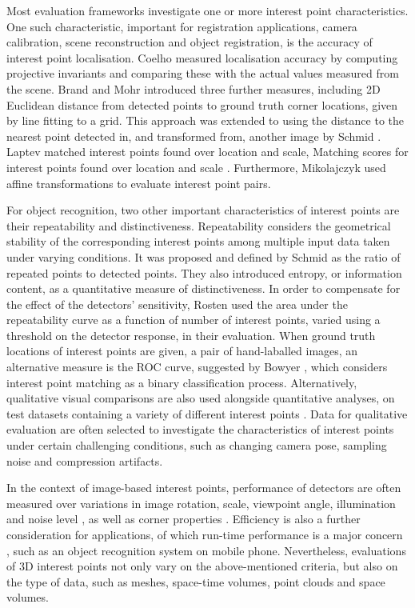 Most evaluation frameworks investigate one or more interest point characteristics. 
One such characteristic, important for registration applications, \eg camera calibration, scene reconstruction and object registration, is the accuracy of interest point localisation. 
Coelho \etal \cite{Coelho1992} measured localisation accuracy by computing projective invariants and comparing these with the actual values measured from the scene. 
Brand and Mohr \cite{Brand1994} introduced three further measures, including 2D Euclidean distance from detected points to ground truth corner locations, given by line fitting to a grid. This approach was extended to using the distance to the nearest point detected in, and transformed from, another image by Schmid \etal \cite{Schmid2000}. 
Laptev \cite{Laptev2003} matched interest points found over location and scale, 
Matching scores for interest points found over location and scale \cite{Laptev2003}. Furthermore, Mikolajczyk \etal \cite{Mikolajczyk2004} used affine transformations to evaluate interest point pairs. 

For object recognition, two other important characteristics of interest points are their repeatability and distinctiveness. 
Repeatability considers the geometrical stability of the corresponding interest points among multiple input data taken under varying conditions. 
It was proposed and defined by Schmid \etal \cite{Schmid2000} as the ratio of repeated points to detected points. They also introduced entropy, or information content, as a quantitative measure of distinctiveness.
In order to compensate for the effect of the detectors' sensitivity, Rosten \etal \cite{Rosten2010} used the area under the repeatability curve as a function of number of interest points, varied using a threshold on the detector response, in their evaluation. 
When ground truth locations of interest points are given, \eg a pair of hand-laballed images, an alternative measure is the ROC curve, suggested by Bowyer \etal \cite{Bowyer}, which considers interest point matching as a binary classification process. Alternatively, qualitative visual comparisons are also used alongside quantitative analyses, on test datasets containing a variety of different interest points \cite{Lindeberg1998, Laptev2005}. Data for qualitative evaluation are often selected to investigate the characteristics of interest points under certain challenging conditions, such as changing camera pose, sampling noise and compression artifacts. 

In the context of image-based interest points, performance of detectors are often measured over variations in image rotation, scale, viewpoint angle, illumination and noise level \cite{Schmid2000}, as well as corner properties \cite{Rajan1989}. Efficiency is also a further consideration for applications, of which run-time performance is a major concern \cite{Rosten2010}, such as an object recognition system on mobile phone. Nevertheless, evaluations of 3D interest points not only vary on the above-mentioned criteria, but also on the type of data, such as meshes, space-time volumes, point clouds and space volumes.

